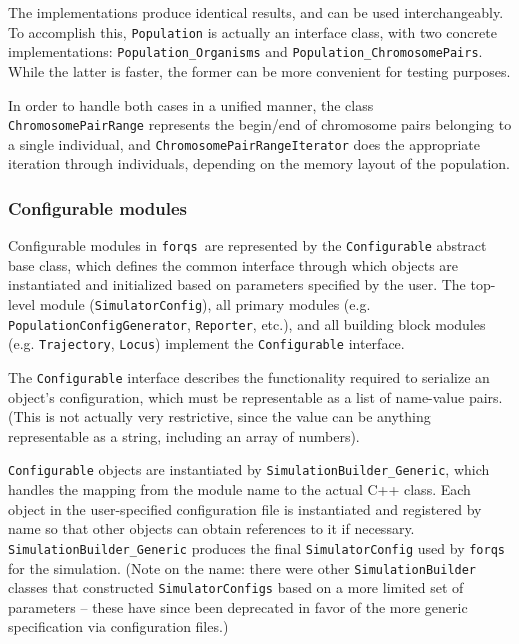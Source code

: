 \documentclass{article}
\newcommand{\forqs}[0]{\texttt{forqs }}
\begin{document}
\begin{sloppypar}
The implementations produce identical results, and can be used interchangeably.
To accomplish this, \texttt{Population} is actually an interface class,
with two concrete implementations: \texttt{Population\_Organisms} and 
\texttt{Population\_ChromosomePairs}.  While the latter is faster, the former
can be more convenient for testing purposes.
\end{sloppypar}

\begin{sloppypar}
In order to handle both cases in a unified manner, the class
\texttt{ChromosomePairRange} represents the begin/end of chromosome pairs
belonging to a single individual, and \texttt{ChromosomePairRangeIterator}
does the appropriate iteration through individuals, depending on the
memory layout of the population.
\end{sloppypar}


\subsubsection{Configurable modules}

\begin{sloppypar}
Configurable modules in \forqs are represented by the \texttt{Configurable}
abstract base class, which defines the common interface through which objects
are instantiated and initialized based on parameters specified by the user.
The top-level module (\texttt{SimulatorConfig}), all primary modules 
(e.g. \texttt{PopulationConfigGenerator}, \texttt{Reporter}, etc.), and
all building block modules (e.g. \texttt{Trajectory}, \texttt{Locus}) 
implement the \texttt{Configurable} interface.
\end{sloppypar}

The \texttt{Configurable} interface describes the functionality
required to serialize an object's configuration, which must be representable as
a list of name-value pairs.  (This is not actually very restrictive, since the
value can be anything representable as a string, including an array of
numbers).

\begin{sloppypar}
\texttt{Configurable} objects are instantiated by \texttt{SimulationBuilder\_Generic},
which handles the mapping from the module name to the actual C++ class.  Each
object in the user-specified configuration file is instantiated and registered
by name so that other objects can obtain references to it if necessary.  
\texttt{SimulationBuilder\_Generic} produces the final \texttt{SimulatorConfig}
used by \forqs for the simulation.
(Note on the name: there were other \texttt{SimulationBuilder} classes that 
constructed \texttt{SimulatorConfigs} based on a more limited set of parameters --
these have since been deprecated in favor of the more generic specification
via configuration files.)
\end{sloppypar}
\end{document}
